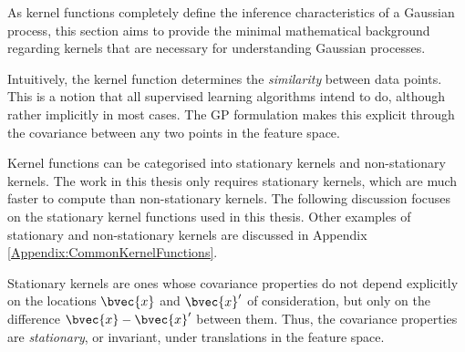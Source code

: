 			As kernel functions completely define the inference characteristics of a Gaussian process, this section aims to provide the minimal mathematical background regarding kernels that are necessary for understanding Gaussian processes. 
			
			Intuitively, the kernel function determines the \textit{similarity} between data points. This is a notion that all supervised learning algorithms intend to do, although rather implicitly in most cases. The GP formulation makes this explicit through the covariance between any two points in the feature space.
			
			Kernel functions can be categorised into stationary kernels and non-stationary kernels. The work in this thesis only requires stationary kernels, which are much faster to compute than non-stationary kernels. The following discussion focuses on the stationary kernel functions used in this thesis. Other examples of stationary and non-stationary kernels are discussed in Appendix \ref{Appendix:CommonKernelFunctions}.
			
			Stationary kernels are ones whose covariance properties do not depend explicitly on the locations $\bvec{x}$ and $\bvec{x}'$ of consideration, but only on the difference $\bvec{x} - \bvec{x}'$ between them. Thus, the covariance properties are \textit{stationary}, or invariant, under translations in the feature space.
			
